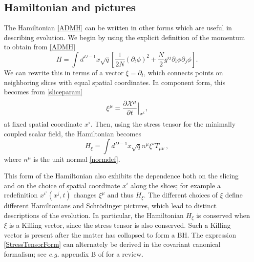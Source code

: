 \documentclass[12pt]{article}
\numberwithin{equation}{section}
\newcommand{\beq}{\begin{equation}}
\newcommand{\eeq}{\end{equation}}
\begin{document}
\subsection{Hamiltonian and pictures}\label{HandP}

The Hamiltonian \eqref{ADMH} can be written in other forms which are useful in describing evolution. We begin by using  the explicit definition of the 
momentum to obtain from \eqref{ADMH}
\beq\label{LapseForm}
H= \int d^{D-1}x \sqrt{q} \left[\frac{1}{2N} (\partial_t\phi)^2+\frac{N}{2}g^{ij} \partial_i \phi \partial_j \phi \right].
\eeq 
We can rewrite this in terms of a vector $\xi=\partial_t$, which connects points on neighboring slices with equal spatial coordinates.
In component form, this becomes from \eqref{sliceparam}
\beq
\xi^{\mu} = \frac{\partial {\cal X}^{\mu}}{\partial t}\Big\vert_{x^i},
\eeq 
at fixed spatial coordinate $x^i$. Then, using the stress tensor for the minimally coupled scalar field, the  Hamiltonian becomes
\beq\label{StressTensorForm}
H_{\xi}= \int d^{D-1}x \sqrt{q} n^{\mu} \xi^{\nu} T_{\mu\nu}\ ,
\eeq
where $n^{\mu}$ is the unit normal \eqref{normdef}. 

This form of the Hamiltonian also exhibits the dependence both on the slicing and on the choice of spatial coordinate $x^i$ along the slices; for example a redefinition $x^{i\prime}(x^j,t)$ changes $\xi^\mu$ and thus $H_\xi$.  The different choices of $\xi$ define different Hamiltonians and Schr\"odinger pictures,  which lead to distinct descriptions of the evolution.  In particular, the Hamiltonian $H_{\xi}$ is conserved when $\xi$ is a Killing vector, since the stress tensor is also conserved. Such a Killing vector is present after the  matter has collapsed to form a BH.  The expression \eqref{StressTensorForm} can alternately be derived in the covariant canonical formalism; see {\it e.g.} appendix B of \cite{DoGi2} for a review.
\end{document}
